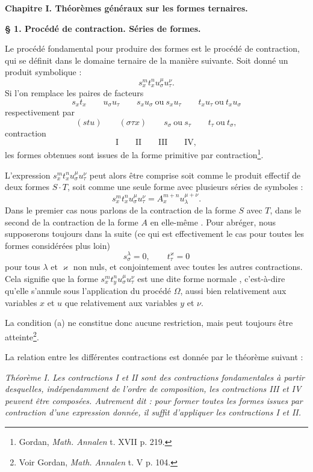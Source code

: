 \documentclass[11pt]{article}
\begin{document}
\begin{center}
{\Large\bfseries Chapitre I. \quad Théorèmes généraux sur les formes ternaires.}
\end{center}

\begin{center}
\textbf{\S{} 1. \quad Procédé de contraction. \quad Séries de formes.}
\end{center}

Le procédé fondamental pour produire des formes est le procédé de contraction, qui se définit dans le domaine ternaire de la manière suivante. Soit donné un produit symbolique :
\[
s_x^m t_x^n u_\sigma^\mu u_\tau^\nu .
\]
Si l'on remplace les paires de facteurs
\[
s_xt_x\qquad u_\sigma u_\tau\qquad s_xu_\sigma\ \text{ou}\ s_xu_\tau
\qquad t_xu_\tau\ \text{ou}\ t_xu_\sigma
\]
respectivement par
\[
(stu)\qquad (\sigma\tau x)\qquad s_\sigma\ \text{ou}\ s_\tau
\qquad t_\tau\ \text{ou}\ t_\sigma,
\]
contraction
\[
\text{I}\qquad\text{II}\qquad\text{III}\qquad\text{IV},
\]
les formes obtenues sont issues de la forme primitive par contraction\footnote{Gordan, \emph{Math. Annalen} t. XVII p. 219.}.

L'expression $s_x^m t_x^n u_\sigma^\mu u_\tau^\nu$ peut alors être comprise soit comme le produit effectif de deux formes $S\cdot T$, soit comme une seule forme avec plusieurs séries de symboles :
\[
s_x^m t_x^n u_\sigma^\mu u_\tau^\nu=A_x^{m+n}u_\lambda^{\mu+\nu}.
\]
Dans le premier cas nous parlons de la contraction de la forme $S$ avec $T$, dans le second de la \og{} contraction de la forme $A$ en elle-même \fg{}. Pour abréger, nous supposerons toujours dans la suite (ce qui est effectivement le cas pour toutes les formes considérées plus loin)
\[
\tag{a}
s_\sigma^\lambda=0,\qquad t_\tau^\varkappa=0
\]
pour tous $\lambda$ et $\varkappa$ non nuls, et conjointement avec toutes les autres contractions. Cela signifie que la forme $s_x^m t_y^n u_\sigma^\mu u_\tau^\nu$ est une dite \og{} forme normale \fg{}, c'est-à-dire qu'elle s'annule sous l'application du procédé $\Omega$, aussi bien relativement aux variables $x$ et $u$ que relativement aux variables $y$ et $\nu$.

La condition (a) ne constitue donc aucune restriction, mais peut toujours être atteinte\footnote{Voir Gordan, \emph{Math. Annalen} t. V p. 104.}.

La relation entre les différentes contractions est donnée par le théorème suivant :

\emph{Théorème I. Les contractions I et II sont des contractions fondamentales à partir desquelles, indépendamment de l'ordre de composition, les contractions III et IV peuvent être composées. Autrement dit : pour former toutes les formes issues par contraction d'une expression donnée, il suffit d'appliquer les contractions I et II.}
\end{document}
